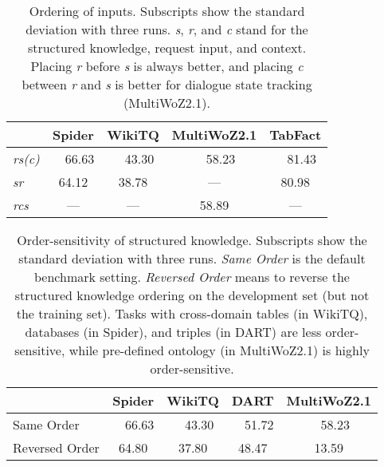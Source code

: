 \documentclass[11pt]{article}
\newcommand{\na}{\multicolumn{1}{c}{---}}
\begin{document}
\begin{table}[t]
	\centering
	\small
	\begin{adjustbox}{width=0.95\linewidth}
		\begin{tabular}{@{}lcccc@{}}
		    \toprule
		    & Spider & WikiTQ & MultiWoZ2.1 & TabFact\\
			\midrule
			 \textit{rs(c)} & \quad \ \ 66.63 & \quad \ \ 43.30 & \quad \ \ 58.23 & \quad \ \ 81.43 \\
			 \textit{sr} & 64.12 & 38.78 & \na & 80.98 \\ \textit{rcs} & \na & \na & 58.89 & \na \\
			\bottomrule
		\end{tabular}
	\end{adjustbox}
	\caption{Ordering of inputs. Subscripts show the standard deviation with three runs. \textit{s}, \textit{r}, and \textit{c} stand for the structured knowledge, request input, and context. Placing \textit{r} before \textit{s} is always better, and placing \textit{c} between \textit{r} and \textit{s} is better for dialogue state tracking (MultiWoZ2.1).
	}
	\label{tab:sk_txt_ordering}
\end{table}

\begin{table}[t]
    \small
	\centering
	\begin{adjustbox}{width=1\linewidth}
		\begin{tabular}{@{}l@{}cccc@{}}
		    \toprule
			& Spider & WikiTQ & DART & MultiWoZ2.1 \\
			\midrule
			Same Order & \quad \ \ 66.63 & \quad \ \ 43.30 & \quad \ \ 51.72 & \quad \ \ 58.23 \\
			Reversed Order & 64.80 & 37.80 & 48.47 & 13.59 \\
			\bottomrule
		\end{tabular}
	\end{adjustbox}
	\caption{Order-sensitivity of structured knowledge. Subscripts show the standard deviation with three runs. \textit{Same Order} is the default benchmark setting. \textit{Reversed Order} means to reverse the structured knowledge ordering on the development set (but not the training set). 
	Tasks with cross-domain tables (in WikiTQ), databases (in Spider), and triples (in DART) are less order-sensitive, while pre-defined ontology (in MultiWoZ2.1) is highly order-sensitive. }
	\label{tab:sk_ordering}
\end{table}
\end{document}
